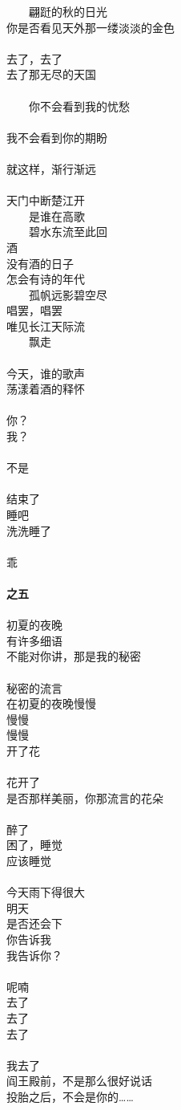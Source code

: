 　　翩跹的秋的日光\\
你是否看见天外那一缕淡淡的金色\\
\\
去了，去了\\
去了那无尽的天国\\
\\
　　你不会看到我的忧愁\\
\\
我不会看到你的期盼\\
\\
就这样，渐行渐远\\
\\
天门中断楚江开\\
　　是谁在高歌\\
　　碧水东流至此回\\
酒\\
没有酒的日子\\
怎会有诗的年代\\
　　孤帆远影碧空尽\\
唱罢，唱罢\\
唯见长江天际流\\
　　飘走\\
\\
今天，谁的歌声\\
荡漾着酒的释怀\\
\\
你？\\
我？\\
\\
不是\\
\\
结束了\\
睡吧\\
洗洗睡了\\
\\
乖\\
\\
\textbf{之五}\\
\\
初夏的夜晚\\
有许多细语\\
不能对你讲，那是我的秘密\\
\\
秘密的流言\\
在初夏的夜晚慢慢\\
慢慢\\
慢慢\\
开了花\\
\\
花开了\\
是否那样美丽，你那流言的花朵\\
\\
醉了\\
困了，睡觉\\
应该睡觉\\
\\
今天雨下得很大\\
明天\\
是否还会下\\
你告诉我\\
我告诉你？\\
\\
呢喃\\
去了\\
去了\\
去了\\
\\
我去了\\
阎王殿前，不是那么很好说话\\
投胎之后，不会是你的……
